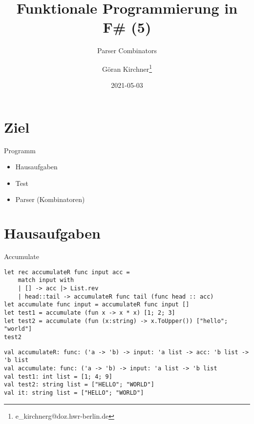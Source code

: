 \documentclass[t]{beamer}
\author{Göran Kirchner\thanks{e\_kirchnerg@doz.hwr-berlin.de}}
\date{2021-05-03}
\title{Funktionale Programmierung in F\# (5)}
\subtitle{Parser Combinators}
\begin{document}
\maketitle

\section{Ziel }
\label{sec:org0ee434b}
\begin{frame}[label={sec:orgc9d6c29}]{Programm}
\begin{itemize}
\item Hausaufgaben
\item Test
\item Parser (Kombinatoren)
\end{itemize}
\end{frame}

\section{Hausaufgaben }
\label{sec:org62f30a3}
\begin{frame}[label={sec:orgfc210c3},fragile]{Accumulate}
 \begin{verbatim}
let rec accumulateR func input acc = 
    match input with
    | [] -> acc |> List.rev
    | head::tail -> accumulateR func tail (func head :: acc)
let accumulate func input = accumulateR func input []
let test1 = accumulate (fun x -> x * x) [1; 2; 3]
let test2 = accumulate (fun (x:string) -> x.ToUpper()) ["hello"; "world"]
test2
\end{verbatim}

\begin{verbatim}
val accumulateR: func: ('a -> 'b) -> input: 'a list -> acc: 'b list -> 'b list
val accumulate: func: ('a -> 'b) -> input: 'a list -> 'b list
val test1: int list = [1; 4; 9]
val test2: string list = ["HELLO"; "WORLD"]
val it: string list = ["HELLO"; "WORLD"]
\end{verbatim}
\end{frame}
\end{document}
